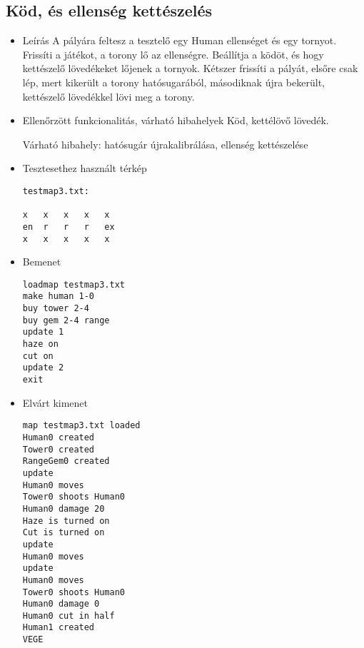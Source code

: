 \subsection{Köd, és ellenség kettészelés}
\begin{itemize}
\item Leírás\newline
A pályára feltesz a tesztelő egy Human ellenséget és egy tornyot. Frissíti a játékot, a torony lő az ellenségre. Beállítja a ködöt, és hogy kettészelő lövedékeket lőjenek a tornyok. Kétszer frissíti a pályát, elsőre csak lép, mert kikerült a torony hatósugarából, másodiknak újra bekerült, kettészelő lövedékkel lövi meg a torony.	
\item Ellenőrzött funkcionalitás, várható hibahelyek\newline
Köd, kettélövő lövedék.

Várható hibahely: hatósugár újrakalibrálása, ellenség kettészelése
\item Tesztesethez használt térkép \newline
\begin{lstlisting}
testmap3.txt:

x	x	x	x	x
en	r	r	r	ex
x	x	x	x	x
\end{lstlisting}
\item Bemenet\newline
\begin{lstlisting}
loadmap testmap3.txt
make human 1-0
buy tower 2-4
buy gem 2-4 range
update 1
haze on
cut on
update 2
exit
\end{lstlisting}
\item Elvárt kimenet\newline
\begin{lstlisting}
map testmap3.txt loaded
Human0 created
Tower0 created
RangeGem0 created
update
Human0 moves
Tower0 shoots Human0
Human0 damage 20
Haze is turned on
Cut is turned on
update
Human0 moves
update
Human0 moves
Tower0 shoots Human0
Human0 damage 0
Human0 cut in half
Human1 created
VEGE
\end{lstlisting}
\end{itemize}

